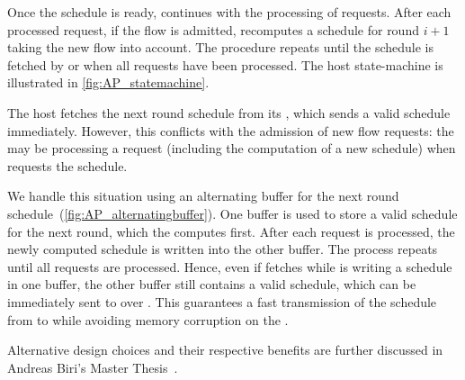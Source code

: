 Once the schedule is ready, \AP continues with the processing of \DRP requests. After each processed request, if the flow is admitted, \AP recomputes a schedule for round $i+1$ taking the new flow into account. The procedure repeats until the schedule is fetched by \CP or when all requests have been processed. The host \AP state-machine is illustrated in \cref{fig:AP_statemachine}.


The host \CP fetches the next round schedule from its \AP, which sends a valid schedule immediately.
However, this conflicts with the admission of new flow requests: the \AP may be processing a request (including the computation of a new schedule) when \CP requests the schedule.

We handle this situation using an alternating buffer for the next round schedule~(\cref{fig:AP_alternatingbuffer}). One buffer is used to store a valid schedule for the next round, which the \AP computes first. After each \DRP request is processed, the newly computed schedule is written into the other buffer. The process repeats until all requests are processed.
%
Hence, even if \CP fetches while \AP is writing a schedule in one buffer, the other buffer still contains a valid schedule, which can be immediately sent to \CP over \bolt.
This guarantees a fast transmission of the schedule from \AP to \CP while avoiding memory corruption on the \AP.

\begin{remark}
  Alternative design choices and their respective benefits are further discussed in Andreas Biri's Master Thesis~\cite{biri2017Unleashing}.
\end{remark}
